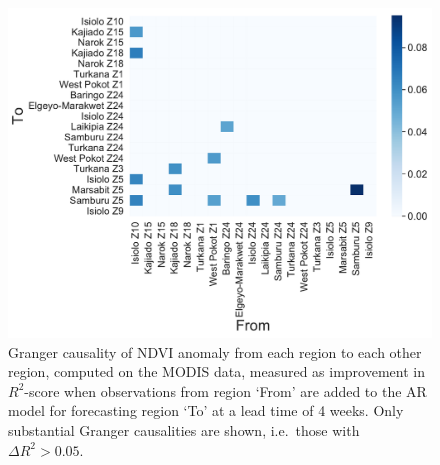 \documentclass[review]{elsarticle}
\begin{document}
\begin{figure} 
	\centering
	\includegraphics[trim = 20mm 0mm 0mm 0mm,width=11 cm]{figures/GCheatmap2.pdf}
	\caption{Granger causality of NDVI anomaly from each region to each other region, computed on the MODIS data, measured as improvement in $R^2$-score when observations from region `From' are added to the AR model for forecasting region `To' at a lead time of 4 weeks. Only substantial Granger causalities are shown, i.e.~those with $\Delta R^2>0.05$.} \label{fig:GCheatmap}
\end{figure}




% 

\newpage
\listoffigures

\listoftables



\end{document}
